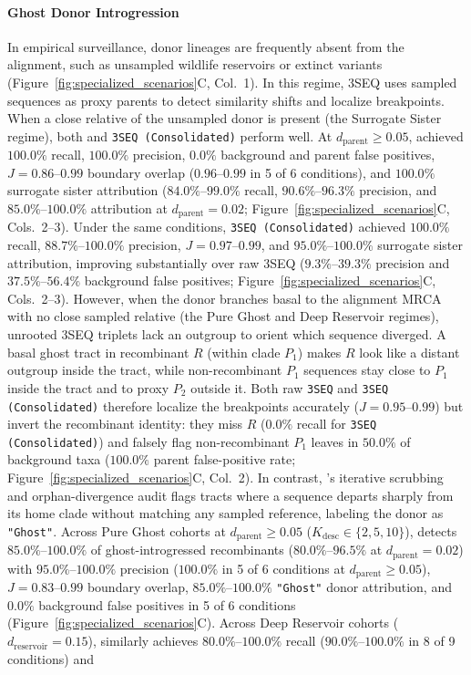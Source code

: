 \paragraph{Ghost Donor Introgression}
In empirical surveillance, donor lineages are frequently absent from the alignment, such as unsampled wildlife reservoirs or extinct variants (Figure~\ref{fig:specialized_scenarios}C, Col.~1). In this regime, 3SEQ uses sampled sequences as proxy parents to detect similarity shifts and localize breakpoints. When a close relative of the unsampled donor is present (the Surrogate Sister regime), both \RhizAeon and \texttt{3SEQ (Consolidated)} perform well. At $d_{\mathrm{parent}} \ge 0.05$, \RhizAeon achieved $100.0\%$ recall, $100.0\%$ precision, $0.0\%$ background and parent false positives, $J = 0.86\text{--}0.99$ boundary overlap ($0.96\text{--}0.99$ in 5 of 6 conditions), and $100.0\%$ surrogate sister attribution ($84.0\%\text{--}99.0\%$ recall, $90.6\%\text{--}96.3\%$ precision, and $85.0\%\text{--}100.0\%$ attribution at $d_{\mathrm{parent}} = 0.02$; Figure~\ref{fig:specialized_scenarios}C, Cols.~2--3). Under the same conditions, \texttt{3SEQ (Consolidated)} achieved $100.0\%$ recall, $88.7\%\text{--}100.0\%$ precision, $J = 0.97\text{--}0.99$, and $95.0\%\text{--}100.0\%$ surrogate sister attribution, improving substantially over raw 3SEQ ($9.3\%\text{--}39.3\%$ precision and $37.5\%\text{--}56.4\%$ background false positives; Figure~\ref{fig:specialized_scenarios}C, Cols.~2--3). However, when the donor branches basal to the alignment MRCA with no close sampled relative (the Pure Ghost and Deep Reservoir regimes), unrooted 3SEQ triplets lack an outgroup to orient which sequence diverged. A basal ghost tract in recombinant $R$ (within clade $P_1$) makes $R$ look like a distant outgroup inside the tract, while non-recombinant $P_1$ sequences stay close to $P_1$ inside the tract and to proxy $P_2$ outside it. Both raw \texttt{3SEQ} and \texttt{3SEQ (Consolidated)} therefore localize the breakpoints accurately ($J = 0.95\text{--}0.99$) but invert the recombinant identity: they miss $R$ ($0.0\%$ recall for \texttt{3SEQ (Consolidated)}) and falsely flag non-recombinant $P_1$ leaves in $50.0\%$ of background taxa ($100.0\%$ parent false-positive rate; Figure~\ref{fig:specialized_scenarios}C, Col.~2). In contrast, \RhizAeon's iterative scrubbing and orphan-divergence audit flags tracts where a sequence departs sharply from its home clade without matching any sampled reference, labeling the donor as \texttt{"Ghost"}. Across Pure Ghost cohorts at $d_{\mathrm{parent}} \ge 0.05$ ($K_{\mathrm{desc}} \in \{2, 5, 10\}$), \RhizAeon detects $85.0\%\text{--}100.0\%$ of ghost-introgressed recombinants ($80.0\%\text{--}96.5\%$ at $d_{\mathrm{parent}} = 0.02$) with $95.0\%\text{--}100.0\%$ precision ($100.0\%$ in 5 of 6 conditions at $d_{\mathrm{parent}} \ge 0.05$), $J = 0.83\text{--}0.99$ boundary overlap, $85.0\%\text{--}100.0\%$ \texttt{"Ghost"} donor attribution, and $0.0\%$ background false positives in 5 of 6 conditions (Figure~\ref{fig:specialized_scenarios}C). Across Deep Reservoir cohorts ($d_{\mathrm{reservoir}} = 0.15$), \RhizAeon similarly achieves $80.0\%\text{--}100.0\%$ recall ($90.0\%\text{--}100.0\%$ in 8 of 9 conditions) and 